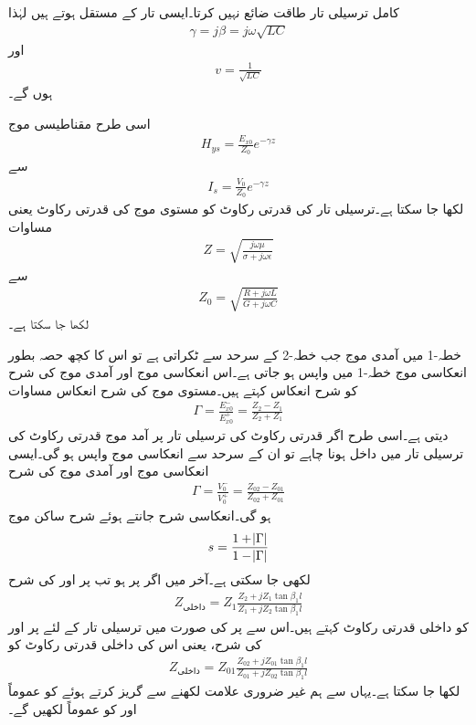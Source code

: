 کامل ترسیلی تار طاقت ضائع نہیں کرتا۔ایسی تار کے مستقل  ہوتے ہیں لہٰذا
\begin{align*}
\gamma=j \beta=j \omega \sqrt{LC}
\end{align*}
اور 
\begin{align}
v=\frac{1}{\sqrt{LC}}
\end{align}
ہوں گے۔

اسی طرح مقناطیسی موج
\begin{align*}
H_{ys}=\frac{E_{x0}}{Z_0} e^{-\gamma z}
\end{align*}
سے
\begin{align}
I_s=\frac{V_0}{Z_0} e^{-\gamma z}
\end{align}
لکھا جا سکتا ہے۔ترسیلی تار کی قدرتی رکاوٹ  کو مستوی موج کی قدرتی رکاوٹ یعنی مساوات 
\begin{align*}
Z=\sqrt{\frac{j\omega \mu}{\sigma +j\omega \epsilon}}
\end{align*}
سے
\begin{align}
Z_0=\sqrt{\frac{R+j\omega L}{G+j \omega C}}
\end{align}
لکھا جا سکتا ہے۔

خطہ-1 میں آمدی موج جب خطہ-2 کے سرحد سے ٹکراتی ہے تو اس کا کچھ حصہ بطور انعکاسی موج خطہ-1 میں واپس ہو جاتی ہے۔اس انعکاسی موج اور آمدی موج کی شرح کو شرح انعکاس کہتے ہیں۔مستوی موج کی شرح انعکاس مساوات 
\begin{align*}
\Gamma=\frac{E_{x0}^-}{E_{x0}^+}=\frac{Z_2-Z_1}{Z_2+Z_1}
\end{align*}
دیتی ہے۔اسی طرح اگر  قدرتی رکاوٹ کی ترسیلی تار پر آمد موج  قدرتی رکاوٹ کی ترسیلی تار میں داخل ہونا چاہے تو ان کے سرحد سے انعکاسی موج واپس ہو گی۔ایسی انعکاسی موج اور آمدی موج کی شرح
\begin{align}
\Gamma=\frac{V_0^-}{V_0^+}=\frac{Z_{02}-Z_{01}}{Z_{02}+Z_{01}}
\end{align}
 ہو گی۔انعکاسی شرح جانتے ہوئے شرح ساکن موج
\begin{align}
s=\frac{1+\abs{\Gamma}}{1-\abs{\Gamma}}
\end{align}
لکھی جا سکتی ہے۔آخر میں اگر  پر  ہو تب  پر  اور  کی شرح 
\begin{align*}
Z_{\text{داخلی}}=Z_1 \frac{Z_2+j Z_1 \tan \beta_1 l}{Z_1 +j Z_2 \tan \beta_1 l}
\end{align*}
کو داخلی قدرتی رکاوٹ  کہتے ہیں۔اس سے  پر  کی صورت میں ترسیلی تار کے لئے  پر  اور  کی شرح، یعنی اس کی داخلی قدرتی رکاوٹ کو
\begin{align}\label{مساوات_ترسیلی_داخلی_قدرتی_رکاوٹ_تعریف}
Z_{\text{داخلی}}=Z_{01} \frac{Z_{02}+j Z_{01}\tan \beta_1 l}{Z_{01}+j Z_{02}\tan \beta_1 l}
\end{align}
لکھا جا سکتا ہے۔یہاں سے ہم غیر ضروری علامت لکھنے سے گریز کرتے ہوئے  کو عموماً  اور  کو عموماً  لکھیں گے۔


